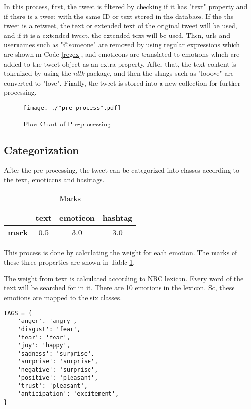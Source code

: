 In this process, first, the tweet is filtered by checking if it has "text" property and if there is a tweet with the same ID or text stored in the database. If the the tweet is a retweet, the text or extended text of the original tweet will be used, and if it is a extended tweet, the extended text will be used. Then, urls and usernames such as "@someone" are removed by using regular expressions which are shown in Code \ref{regex}, and emoticons are translated to emotions which are added to the tweet object as an extra property. After that, the text content is tokenized by using the \textit{nltk} package, and then the slangs such as "looove" are converted to "love". Finally, the tweet is stored into a new collection for further processing.

\begin{figure}[ht]
    \centering
    \texttt{[image: ./"pre\_process".pdf]}
    \caption{Flow Chart of Pre-processing}
    \label{pre_processing}
\end{figure}

\subsection{Categorization}

After the pre-processing, the tweet can be categorized into classes according to the text, emoticons and hashtags.

\begin{table}[ht]
    \centering
    \begin{tabular}{|l|l|l|l|}
        \hline
         & text & emoticon & hashtag \\ \hline
        \textbf{mark} & \multicolumn{1}{c|}{0.5} & \multicolumn{1}{c|}{3.0} & \multicolumn{1}{c|}{3.0} \\ \hline
    \end{tabular}
    \caption{Marks}
    \label{marks}
\end{table}

This process is done by calculating the weight for each emotion. The marks of these three properties are shown in Table \ref{marks}.

The weight from text is calculated according to NRC lexicon. Every word of the text will be searched for in it. There are 10 emotions in the lexicon. So, these emotions are mapped to the six classes.

\begin{lstlisting}[caption={NRC Lexicon Map},captionpos=b,label={nrc}]
TAGS = {
    'anger': 'angry',
    'disgust': 'fear',
    'fear': 'fear',
    'joy': 'happy',
    'sadness': 'surprise',
    'surprise': 'surprise',
    'negative': 'surprise',
    'positive': 'pleasant',
    'trust': 'pleasant',
    'anticipation': 'excitement',
}
\end{lstlisting}

